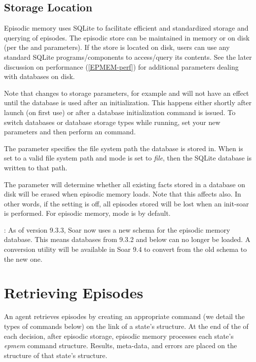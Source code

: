 \subsection{Storage Location}

Episodic memory uses SQLite to facilitate efficient and standardized storage and querying of episodes.
The episodic store can be maintained in memory or on disk (per the  and  parameters).
If the store is located on disk, users can use any standard SQLite programs/components to access/query its contents.
See the later discussion on performance (\ref{EPMEM-perf}) for additional parameters dealing with databases on disk.

Note that changes to storage parameters, for example  and  will not have an effect until the database is used after an initialization. This happens either shortly after launch (on first use) or after a database initialization command is issued. To switch databases or database storage types while running, set your new parameters and then perform an  command.

The  parameter specifies the file system path the database is stored in. When  is set to a valid file system path and  mode is set to \emph{file}, then the SQLite database is written to that path.

The  parameter will determine whether all existing facts stored in a database on disk will be erased when episodic memory loads. Note that this affects  also.  In other words, if the  setting is off, all episodes stored will be lost when an init-soar is performed. For episodic memory,  mode is  by default.

: As of version 9.3.3, Soar now uses a new schema for the episodic memory database. This means databases from 9.3.2 and below can no longer be loaded.  A conversion utility will be available in Soar 9.4 to convert from the old schema to the new one.

\section{Retrieving Episodes}
\label{EPMEM-retrieval}

An agent retrieves episodes by creating an appropriate command (we detail the types of commands below) on the  link of a state's  structure.
At the end of the  of each decision, after episodic storage, episodic memory processes each state's \emph{epmem} command structure.
Results, meta-data, and errors are placed on the  structure of that state's  structure.

